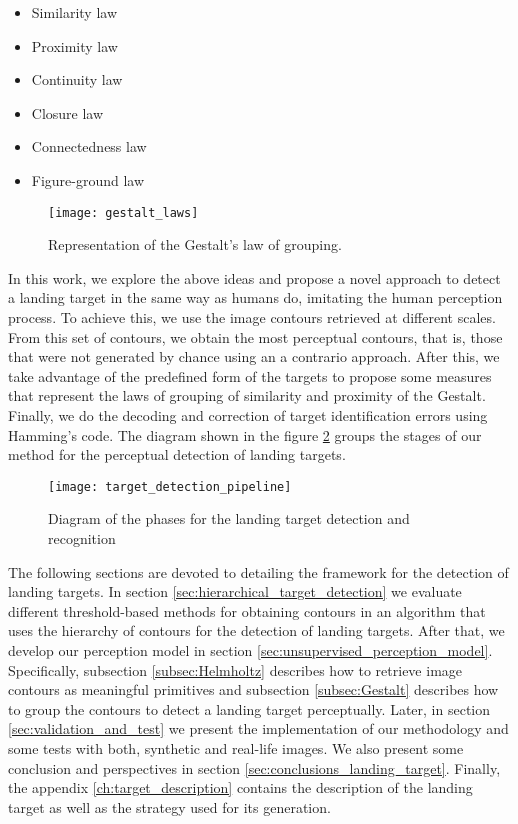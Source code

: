 \begin{itemize}
	\item Similarity law
	\item Proximity law
	\item Continuity law
	\item Closure law
	\item Connectedness law
	\item Figure-ground law
	
\end{itemize}

\begin{figure}[!ht]
    \centering
    \texttt{[image: gestalt\_laws]}        
    \caption{Representation of the Gestalt's law of grouping.}\label{fig:gestalt_laws}
\end{figure}

In this work, we explore the above ideas and propose a novel approach to detect a landing target in the same way as humans do, imitating the human perception process. To achieve this, we use the image contours retrieved at different scales. From this set of contours, we obtain the most perceptual contours, that is, those that were not generated by chance using an a contrario approach. After this, we take advantage of the predefined form of the targets to propose some measures that represent the laws of grouping of similarity and proximity of the Gestalt. Finally, we do the decoding and correction of target identification errors using Hamming's code. The diagram shown in the figure \ref{fig:target_detection_pipeline} groups the stages of our method for the perceptual detection of landing targets.

\begin{figure}[!ht]
    \centering
    \texttt{[image: target\_detection\_pipeline]}        
    \caption{Diagram of the phases for the landing target detection and recognition}\label{fig:target_detection_pipeline}
\end{figure}

The following sections are devoted to detailing the framework for the detection of landing targets. In section \ref{sec:hierarchical_target_detection} we evaluate different threshold-based methods for obtaining contours in an algorithm that uses the hierarchy of contours for the detection of landing targets. After that, we develop our perception model in section \ref{sec:unsupervised_perception_model}. Specifically, subsection \ref{subsec:Helmholtz} describes how to retrieve image contours as meaningful primitives and subsection \ref{subsec:Gestalt} describes how to group the contours to detect a landing target perceptually.  Later, in section \ref{sec:validation_and_test} we present the implementation of our methodology and some tests with both, synthetic and real-life images. We also present some conclusion and perspectives in section \ref{sec:conclusions_landing_target}. Finally, the appendix \ref{ch:target_description} contains the description of the landing target as well as the strategy used for its generation.


